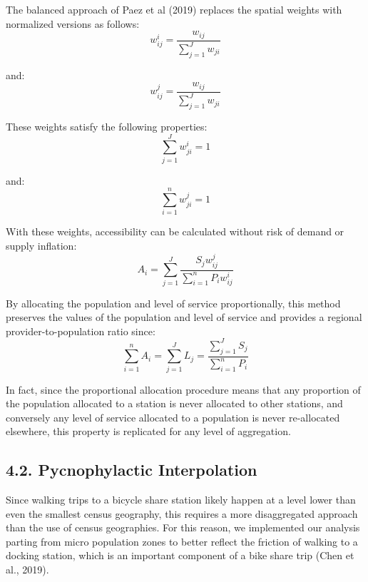 \documentclass[]{elsarticle} %
\begin{document}
The balanced approach of Paez et al (2019) replaces the spatial weights
with normalized versions as follows: \begin{equation}
\label{eq:spatial-weights}
{w_{ij}^{i} = \frac {w_{ij}}{\sum_{j = 1}^{J} {w_{ji}}}}
\end{equation}

\noindent and: \begin{equation}
\label{eq:spatial-weights-2}
{w_{ij}^{j} = \frac {w_{ij}}{\sum_{j = 1}^{J} {w_{ji}}}}
\end{equation}

These weights satisfy the following properties: \begin{equation}
\label{eq:weights}
\sum_{j = 1}^{J} {w^i_{ji}} = 1
\end{equation}

\noindent and: \begin{equation}
\label{eq:weights-2}
\sum_{i = 1}^{n} {w^j_{ji}} = 1
\end{equation}

With these weights, accessibility can be calculated without risk of
demand or supply inflation: \begin{equation}
\label{eq:balanced-accessibility}
A_i = {\sum_{j = 1}^{J} \frac {S_j{w^j_{ij}}}{\sum_{i = 1}^{n} P_i{w^i_{ij}}}}
\end{equation}

By allocating the population and level of service proportionally, this
method preserves the values of the population and level of service and
provides a regional provider-to-population ratio since: \begin{equation}
\label{eq:proportionality}
\sum_{i=1}^n A_i = \sum_{j=1}^J L_j = \frac{\sum_{j=1}^JS_j}{\sum_{i=1}^n P_i}
\end{equation}

In fact, since the proportional allocation procedure means that any
proportion of the population allocated to a station is never allocated
to other stations, and conversely any level of service allocated to a
population is never re-allocated elsewhere, this property is replicated
for any level of aggregation.

\hypertarget{pycnophylactic-interpolation}{%
\subsection{4.2. Pycnophylactic
Interpolation}\label{pycnophylactic-interpolation}}

Since walking trips to a bicycle share station likely happen at a level
lower than even the smallest census geography, this requires a more
disaggregated approach than the use of census geographies. For this
reason, we implemented our analysis parting from micro population zones
to better reflect the friction of walking to a docking station, which is
an important component of a bike share trip (Chen et al., 2019).
\end{document}
